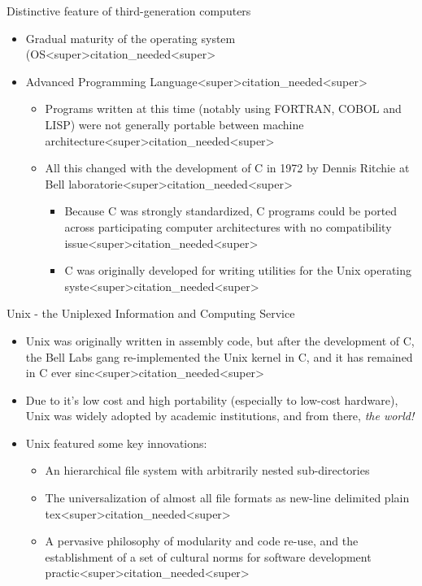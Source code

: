 \documentclass[11pt]{beamer}
\let\OldTexttt\texttt
\renewcommand{\texttt}[1]{\OldTexttt{\color{teal}{#1}}}
\begin{document}
\begin{frame}{Distinctive feature of third-generation computers}
\begin{itemize}
    \item Gradual maturity of the operating system (OS<super>citation_needed<super>
    \item Advanced Programming Language<super>citation_needed<super>
    \begin{itemize}
        \item Programs written at this time (notably using FORTRAN, COBOL and LISP) were not generally portable between machine architecture<super>citation_needed<super> \texttt{Incompatible due to a lack of standardization!}
        
        \item All this changed with the development of C in 1972 by Dennis Ritchie at Bell laboratorie<super>citation_needed<super>
        \begin{itemize}
            \item Because C was strongly standardized, C programs could be ported across participating computer architectures with no compatibility issue<super>citation_needed<super>
            \item C was originally developed for writing utilities for the Unix operating syste<super>citation_needed<super>
        \end{itemize}
    \end{itemize}
\end{itemize}

\end{frame}

\begin{frame}{Unix - the Uniplexed Information and Computing Service}
\begin{itemize}
\item Unix was originally written in assembly code, but after the development of C, the Bell Labs gang re-implemented the Unix kernel in C, and it has remained in C ever sinc<super>citation_needed<super>  
\item Due to it's low cost and high portability (especially to low-cost hardware), Unix was widely adopted by academic institutions, and from there, \emph{the world!}
\item Unix featured some key innovations: 
    \begin{itemize}
        \item An hierarchical file system with arbitrarily nested sub-directories
        \item The universalization of almost all file formats as new-line delimited plain tex<super>citation_needed<super>  
        \item A pervasive philosophy of modularity and code re-use, and the establishment of a set of cultural norms for software development practic<super>citation_needed<super>   
    \end{itemize}
\end{itemize}
\end{frame}
\end{document}
